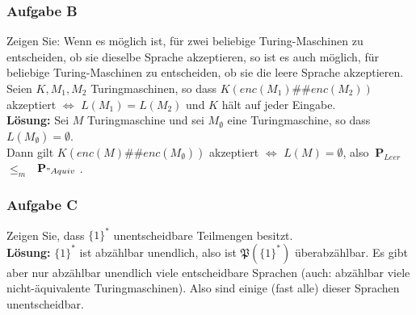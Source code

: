 \documentclass[a4paper,10pt]{article}
\newcommand{\prob}[1]{\textbf{#1}}
\newcommand{\prspec}[1]{$~\prob{P}_{#1}~$}
\begin{document}
    \subsubsection*{Aufgabe B}
        Zeigen Sie: Wenn es möglich ist, für zwei beliebige Turing-Maschinen zu entscheiden, ob sie dieselbe Sprache akzeptieren, so ist es auch möglich, für beliebige Turing-Maschinen zu entscheiden, ob sie die leere Sprache akzeptieren. Seien $K, M_1, M_2$ Turingmaschinen, so dass $K(enc(M_1)\#\#enc(M_2))$ akzeptiert $\Leftrightarrow$ $L(M_1) = L(M_2)$ und $K$ hält auf jeder Eingabe. \\
        \textbf{Lösung:} Sei $M$ Turingmaschine und sei $M_\emptyset$ eine Turingmaschine, so dass $L(M_\emptyset) = \emptyset$. \\
        Dann gilt $K(enc(M)\#\#enc(M_\emptyset))$ akzeptiert $\Leftrightarrow$ $L(M) = \emptyset$, also \prspec{Leer} $\leq_m$ \prspec{"Aquiv}.

    \subsubsection*{Aufgabe C}
        Zeigen Sie, dass $\{1\}^*$ unentscheidbare Teilmengen besitzt. \\
        \textbf{Lösung:} $\{1\}^*$ ist abzählbar unendlich, also ist $\mathfrak{P}(\{1\}^*)$ überabzählbar. Es gibt aber nur abzählbar unendlich viele entscheidbare Sprachen (auch: abzählbar viele nicht-äquivalente Turingmaschinen). Also sind einige (fast alle) dieser Sprachen unentscheidbar.
\end{document}
